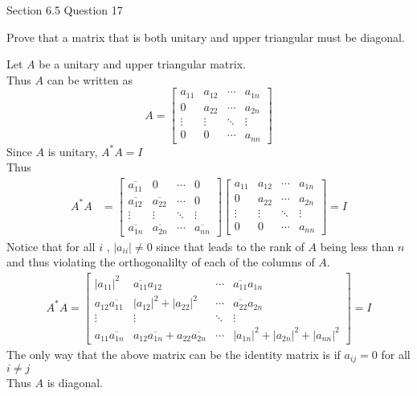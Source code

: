 \documentclass[answers,12pt,addpoints]{exam}
\begin{document}
\begin{questions}
    \question Section 6.5 Question 17

    Prove that a matrix that is both unitary and upper triangular must be diagonal.

    \begin{solution}
        Let $A$ be a unitary and upper triangular matrix.\\
        Thus $A$ can be written as
        $$ A = \begin{bmatrix}
            a_{11} & a_{12} & \cdots & a_{1n}\\
            0 & a_{22} & \cdots & a_{2n}\\
            \vdots & \vdots & \ddots & \vdots\\
            0 & 0 & \cdots & a_{nn}
        \end{bmatrix}$$
        Since $A$ is unitary, $A^*A = I$\\
        Thus
        \begin{align*}
            A^*A &= \begin{bmatrix}
                \overline{a_{11}} & 0 & \cdots & 0\\
                \overline{a_{12}} & \overline{a_{22}} & \cdots & 0\\
                \vdots & \vdots & \ddots & \vdots\\
                \overline{a_{1n}} & \overline{a_{2n}} & \cdots & \overline{a_{nn}}
            \end{bmatrix}
            \begin{bmatrix}
                a_{11} & a_{12} & \cdots & a_{1n}\\
                0 & a_{22} & \cdots & a_{2n}\\
                \vdots & \vdots & \ddots & \vdots\\
                0 & 0 & \cdots & a_{nn}
            \end{bmatrix} = I
        \end{align*}
        Notice that for all $i$ , $|a_{ii}| \neq 0$ since that leads to the rank of $A$ being less than $n$ and thus violating the orthogonalilty of each of the columns of $A$.\\
        \begin{align*}
            A^*A =  
            \begin{bmatrix}
                |a_{11}|^2 & \overline{a_{11}}a_{12} & \cdots & \overline{a_{11}}a_{1n}\\
                a_{12}\overline{a_{11}} & |a_{12}|^2 + |a_{22}|^2 & \cdots & \overline{a_{22}}a_{2n}\\
                \vdots & \vdots & \ddots & \vdots\\
                a_{11}\overline{a_{1n}} & a_{12}\overline{a_{1n}} + a_{22}\overline{a_{2n}} & \cdots & |a_{1n}|^2 + |a_{2n}|^2 + |a_{nn}|^2
            \end{bmatrix} = I
        \end{align*}
        The only way that the above matrix can be the identity matrix is if $a_{ij} = 0$ for all $i \neq j$\\
        Thus $A$ is diagonal.
    \end{solution}


\end{questions}
\end{document}
